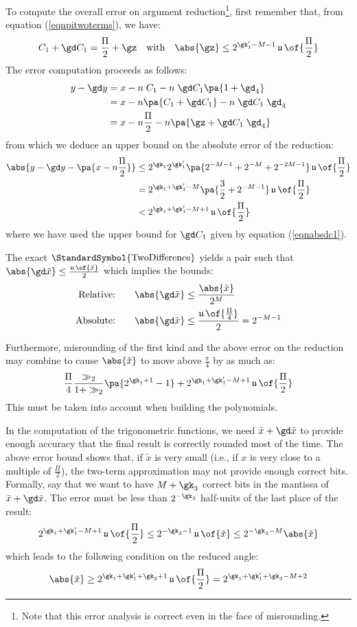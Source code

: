\documentclass[10pt, a4paper, twoside]{basestyle}
\DeclareMathOperator{\ULP}{\mathfrak u}
\DeclareMathOperator{\twodifference}{\StandardSymbol{TwoDifference}}
\newcommand{\red}[1]{\tilde{#1}}
\begin{document}
To compute the overall error on argument reduction\footnote{Note that this error analysis is correct even in the face of misrounding.}, first remember that, from equation (\ref{eqnpitwoterms}), we have:
\[
C_1 + \gd C_1 = \frac{\Pi}{2} + \gz \quad \text{with} \quad \abs{\gz} \leq 2^{\gk'_1 - M - 1} \ULP\of{\frac{\Pi}{2}}
\]
The error computation proceeds as follows:
\begin{align*}
y - \gd y &= x - n \; C_1 - n \; \gd C_1 \pa{1 + \gd_4} \\
&= x - n \pa{C_1 + \gd C_1} - n \; \gd C_1 \; \gd_4 \\
&= x - n \frac{\Pi}{2} - n \pa{\gz + \gd C_1 \; \gd_4}
\end{align*}
from which we deduce an upper bound on the absolute error of the reduction:
\begin{align*}
\abs{y - \gd y - \pa{x - n \frac{\Pi}{2}}} &\leq 2^{\gk_1} 2^{\gk'_1} \pa{2^{- M - 1} + 2^{-M} + 2^{-2 M - 1}} \ULP\of{\frac{\Pi}{2}} \\
&= 2^{\gk_1 + \gk'_1 - M}\pa{\frac{3}{2} + 2^{-M - 1}} \ULP\of{\frac{\Pi}{2}} \\
&< 2^{\gk_1 + \gk'_1 - M + 1} \ULP\of{\frac{\Pi}{2}}
\end{align*}
where we have used the upper bound for $\gd C_1$ given by equation (\ref{eqnabsdc1}).

The exact $\twodifference$ yields a pair such that $\abs{\gd \red x} \le \frac{\ULP\of{\red x}}{2}$ which implies the bounds:
\begin{align*}
\text{Relative:} \qquad &\abs{\gd \red x} \le \frac{\abs{\red x}}{2^M} \\
\text{Absolute:} \qquad &\abs{\gd \red x} \le \frac{\ULP\of{\frac{\Pi}{4}}}{2} = 2^{-M - 1}
\end{align*}

Furthermore, misrounding of the first kind and the above error on the reduction may combine to cause $\abs{\red x}$ to move above $\frac{\pi}{4}$ by as much as:
\[
\frac{\Pi}{4} \frac{\gg_2}{1 + \gg_2} \pa{2^{\gk_1 + 1} - 1} + 2^{\gk_1 + \gk'_1 - M + 1} \ULP\of{\frac{\Pi}{2}}
\]
This must be taken into account when building the polynomials.

In the computation of the trigonometric functions, we need $\red x + \gd \red x$ to provide enough accuracy that the final result is correctly rounded most of the time.  The above error bound shows that, if $\red x$ is very small (i.e., if $x$ is very close to a multiple of $\frac{\Pi}{2}$), the two-term approximation may not provide enough correct bits.  Formally, say that we want to have $M + \gk_3$ correct bits in the mantissa of $\red x + \gd \red x$.  The error must be less than $2^{-\gk_3}$ half-units of the last place of the result:
\begin{equation}
2^{\gk_1 + \gk'_1 - M + 1} \ULP\of{\frac{\Pi}{2}} \leq 2^{-\gk_3 - 1} \ULP\of{\red x} \leq 2^{-\gk_3 - M} \abs{\red x}
\label{eqnreductionbound}
\end{equation}
which leads to the following condition on the reduced angle:
\[
\abs{\red x} \geq 2^{\gk_1 + \gk'_1 + \gk_3 + 1} \ULP\of{\frac{\Pi}{2}} = 2^{\gk_1 + \gk'_1 + \gk_3 - M + 2}
\]
\end{document}
